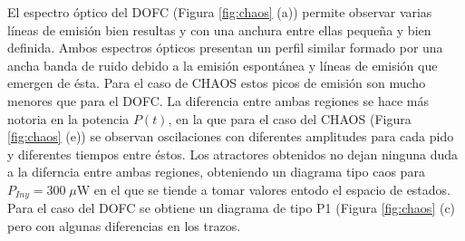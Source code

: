 		El espectro \'optico del DOFC (Figura \ref{fig:chaos} (a)) permite observar varias l\'ineas de emisión bien resultas y con una anchura entre ellas pequeña y bien definida. Ambos espectros \'opticos presentan un perfil similar formado por una ancha banda de ruido debido a la emisi\'on espont\'anea y l\'ineas de emisión que emergen de \'esta. Para el caso de CHAOS estos picos de emisi\'on son mucho menores que para el DOFC. La diferencia entre ambas regiones se hace m\'as notoria en la potencia $P(t)$, en la que para el caso del CHAOS (Figura \ref{fig:chaos} (e)) se observan oscilaciones con diferentes amplitudes para cada pido y diferentes tiempos entre \'estos. Los atractores obtenidos no dejan ninguna duda a la diferncia entre ambas regiones, obteniendo un diagrama tipo caos para $P_{Iny} = 300\;\mu$W en el que se tiende a tomar valores entodo el espacio de estados. Para el caso del DOFC se obtiene un diagrama de tipo P1 (Figura \ref{fig:chaos} (c) pero con algunas diferencias en los trazos.
